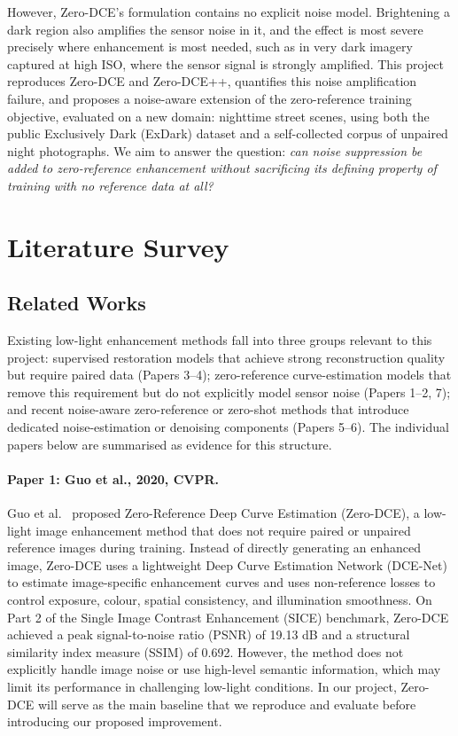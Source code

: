 \documentclass[11pt, letterpaper]{article}
\begin{document}
However, Zero-DCE's formulation contains no explicit noise model. Brightening a dark region also amplifies the sensor noise in it, and the effect is most severe precisely where enhancement is most needed, such as in very dark imagery captured at high ISO, where the sensor signal is strongly amplified. This project reproduces Zero-DCE and Zero-DCE++, quantifies this noise amplification failure, and proposes a noise-aware extension of the zero-reference training objective, evaluated on a new domain: nighttime street scenes, using both the public Exclusively Dark (ExDark) dataset and a self-collected corpus of unpaired night photographs. We aim to answer the question: \textit{can noise suppression be added to zero-reference enhancement without sacrificing its defining property of training with no reference data at all?}

\section{Literature Survey}

\subsection{Related Works}

Existing low-light enhancement methods fall into three groups relevant to this project: supervised restoration models that achieve strong reconstruction quality but require paired data (Papers 3--4); zero-reference curve-estimation models that remove this requirement but do not explicitly model sensor noise (Papers 1--2, 7); and recent noise-aware zero-reference or zero-shot methods that introduce dedicated noise-estimation or denoising components (Papers 5--6). The individual papers below are summarised as evidence for this structure.

\paragraph{Paper 1: Guo et al., 2020, CVPR.}
Guo et al.~\cite{guo2020zero} proposed Zero-Reference Deep Curve Estimation (Zero-DCE), a low-light image enhancement method that does not require paired or unpaired reference images during training. Instead of directly generating an enhanced image, Zero-DCE uses a lightweight Deep Curve Estimation Network (DCE-Net) to estimate image-specific enhancement curves and uses non-reference losses to control exposure, colour, spatial consistency, and illumination smoothness. On Part 2 of the Single Image Contrast Enhancement (SICE) benchmark, Zero-DCE achieved a peak signal-to-noise ratio (PSNR) of 19.13 dB and a structural similarity index measure (SSIM) of 0.692. However, the method does not explicitly handle image noise or use high-level semantic information, which may limit its performance in challenging low-light conditions. In our project, Zero-DCE will serve as the main baseline that we reproduce and evaluate before introducing our proposed improvement.
\end{document}
